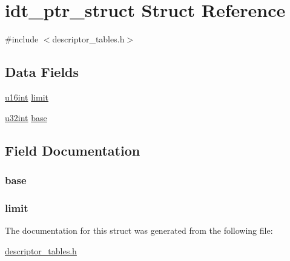 \hypertarget{structidt__ptr__struct}{
\section{idt\_\-ptr\_\-struct Struct Reference}
\label{structidt__ptr__struct}
}


{\ttfamily \#include $<$descriptor\_\-tables.h$>$}

\subsection*{Data Fields}
\begin{DoxyCompactItemize}
\item 
\hyperlink{library_8h_a863d9497073aad2b991aeab2211d87af}{u16int} \hyperlink{structidt__ptr__struct_a68fd3b4f6c14a331ca9b226cbf122e13}{limit}
\item 
\hyperlink{library_8h_ad7ecf93b77285d9bf039d27fa3f1a588}{u32int} \hyperlink{structidt__ptr__struct_ab5763c2b18c825c8b8fba44b2e60ddc1}{base}
\end{DoxyCompactItemize}


\subsection{Field Documentation}
\hypertarget{structidt__ptr__struct_ab5763c2b18c825c8b8fba44b2e60ddc1}{
\subsubsection[{base}]{ {\bf base}}}
\label{structidt__ptr__struct_ab5763c2b18c825c8b8fba44b2e60ddc1}
\hypertarget{structidt__ptr__struct_a68fd3b4f6c14a331ca9b226cbf122e13}{
\subsubsection[{limit}]{ {\bf limit}}}
\label{structidt__ptr__struct_a68fd3b4f6c14a331ca9b226cbf122e13}


The documentation for this struct was generated from the following file:\begin{DoxyCompactItemize}
\item 
\hyperlink{descriptor__tables_8h}{descriptor\_\-tables.h}\end{DoxyCompactItemize}
